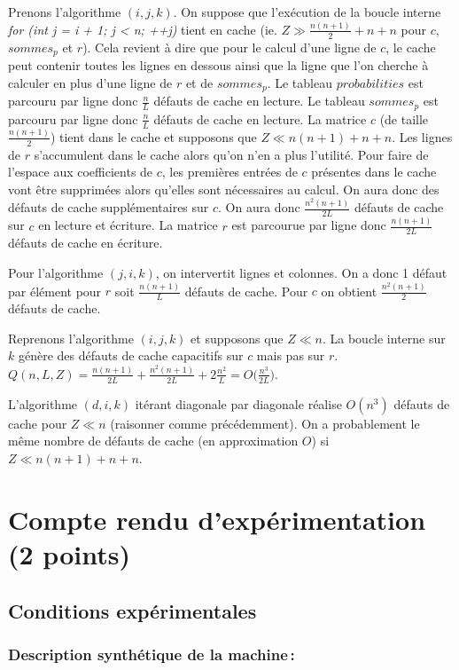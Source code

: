 \documentclass[a4paper, 10pt, french]{article}
\begin{document}
Prenons l'algorithme $(i, j, k)$. On suppose que l'exécution de la boucle interne {\em for (int j = i + 1; j < n; ++j)} tient en cache (ie. $Z \gg \frac{n(n + 1)}{2} + n + n$ pour $c$, $sommes_p$ et $r$).
Cela revient à dire que pour le calcul d'une ligne de $c$, le cache peut contenir toutes les lignes en dessous ainsi que la ligne que l'on cherche à calculer en plus d'une ligne de $r$ et de $sommes_p$.
Le tableau $probabilities$ est parcouru par ligne donc $\frac{n}{L}$ défauts de cache en lecture.
Le tableau $sommes_p$ est parcouru par ligne donc $\frac{n}{L}$ défauts de cache en lecture.
La matrice $c$ (de taille $\frac{n(n + 1)}{2}$) tient dans le cache et supposons que $Z \ll n(n + 1) + n + n$. Les lignes de $r$ s'accumulent dans le cache alors qu'on n'en a plus l'utilité.
Pour faire de l'espace aux coefficients de $c$, les premières entrées de $c$ présentes dans le cache vont être supprimées alors qu'elles sont nécessaires au calcul.
On aura donc des défauts de cache supplémentaires sur $c$. On aura donc $\frac{n^2(n + 1)}{2L}$ défauts de cache sur $c$ en lecture et écriture.
La matrice $r$ est parcourue par ligne donc $\frac{n(n + 1)}{2L}$ défauts de cache en écriture.

Pour l'algorithme $(j, i, k)$, on intervertit lignes et colonnes. On a donc 1 défaut par élément pour $r$ soit $\frac{n(n + 1)}{L}$ défauts de cache. 
Pour $c$ on obtient $\frac{n^2(n + 1)}{2}$ défauts de cache.

Reprenons l'algorithme $(i, j, k)$ et supposons que $Z \ll n$. La boucle interne sur $k$ génère des défauts de cache capacitifs sur $c$ mais pas sur $r$.
$Q(n, L, Z) = \frac{n(n + 1)}{2L} + \frac{n^2(n + 1)}{2L} + 2\frac{n^2}{L} = O\bigg(\frac{n^3}{2L}\bigg)$.

L'algorithme $(d, i, k)$ itérant diagonale par diagonale réalise $O(n^3)$ défauts de cache pour $Z \ll n$ (raisonner comme précédemment). 
On a probablement le même nombre de défauts de cache (en approximation $O$) si $Z \ll n(n + 1) + n + n$.

\section{Compte rendu d'expérimentation (2 points)}
\subsection{Conditions expérimentales}

\subsubsection{Description synthétique de la machine\,:}
\end{document}
